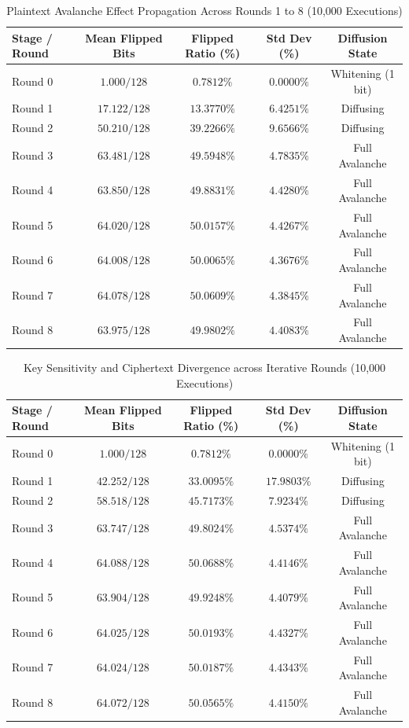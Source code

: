 \begin{table}[htbp]
\caption{Plaintext Avalanche Effect Propagation Across Rounds 1 to 8 (10,000 Executions)}
\label{tab:plaintext_avalanche}
\centering
\small
\begin{tabular}{@{}lcccc@{}}
\toprule
\textbf{Stage / Round} & \textbf{Mean Flipped Bits} & \textbf{Flipped Ratio (\%)} & \textbf{Std Dev (\%)} & \textbf{Diffusion State} \\ \midrule
Round 0 & $1.000 / 128$ & $0.7812\%$ & $0.0000\%$ & Whitening (1 bit) \\
Round 1 & $17.122 / 128$ & $13.3770\%$ & $6.4251\%$ & Diffusing \\
Round 2 & $50.210 / 128$ & $39.2266\%$ & $9.6566\%$ & Diffusing \\
Round 3 & $63.481 / 128$ & $49.5948\%$ & $4.7835\%$ & Full Avalanche \\
Round 4 & $63.850 / 128$ & $49.8831\%$ & $4.4280\%$ & Full Avalanche \\
Round 5 & $64.020 / 128$ & $50.0157\%$ & $4.4267\%$ & Full Avalanche \\
Round 6 & $64.008 / 128$ & $50.0065\%$ & $4.3676\%$ & Full Avalanche \\
Round 7 & $64.078 / 128$ & $50.0609\%$ & $4.3845\%$ & Full Avalanche \\
Round 8 & $63.975 / 128$ & $49.9802\%$ & $4.4083\%$ & Full Avalanche \\
\bottomrule
\end{tabular}
\end{table}

\begin{table}[htbp]
\caption{Key Sensitivity and Ciphertext Divergence across Iterative Rounds (10,000 Executions)}
\label{tab:key_sensitivity}
\centering
\small
\begin{tabular}{@{}lcccc@{}}
\toprule
\textbf{Stage / Round} & \textbf{Mean Flipped Bits} & \textbf{Flipped Ratio (\%)} & \textbf{Std Dev (\%)} & \textbf{Diffusion State} \\ \midrule
Round 0 & $1.000 / 128$ & $0.7812\%$ & $0.0000\%$ & Whitening (1 bit) \\
Round 1 & $42.252 / 128$ & $33.0095\%$ & $17.9803\%$ & Diffusing \\
Round 2 & $58.518 / 128$ & $45.7173\%$ & $7.9234\%$ & Diffusing \\
Round 3 & $63.747 / 128$ & $49.8024\%$ & $4.5374\%$ & Full Avalanche \\
Round 4 & $64.088 / 128$ & $50.0688\%$ & $4.4146\%$ & Full Avalanche \\
Round 5 & $63.904 / 128$ & $49.9248\%$ & $4.4079\%$ & Full Avalanche \\
Round 6 & $64.025 / 128$ & $50.0193\%$ & $4.4327\%$ & Full Avalanche \\
Round 7 & $64.024 / 128$ & $50.0187\%$ & $4.4343\%$ & Full Avalanche \\
Round 8 & $64.072 / 128$ & $50.0565\%$ & $4.4150\%$ & Full Avalanche \\
\bottomrule
\end{tabular}
\end{table}

